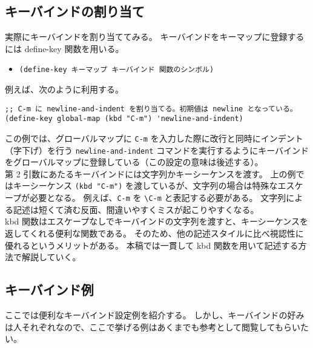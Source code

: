 \subsection{キーバインドの割り当て}
実際にキーバインドを割り当ててみる。
キーバインドをキーマップに登録するには define-key 関数を用いる。
\begin{itemize}\setlength{\leftskip}{-1.00zw}%
\item[] \texttt{(define-key キーマップ キーバインド 関数のシンボル)}
\end{itemize}
例えば、次のように利用する。
\begin{mdframed}[roundcorner=0.50zw,leftmargin=3.00zw,rightmargin=3.00zw,skipabove=0.40zw,skipbelow=0.40zw,innertopmargin=4.00pt,innerbottommargin=4.00pt,innerleftmargin=5.00pt,innerrightmargin=5.00pt,linecolor=gray!020,linewidth=0.50pt,backgroundcolor=gray!20]
\begin{verbatim}
;; C-m に newline-and-indent を割り当てる。初期値は newline となっている。
(define-key global-map (kbd "C-m") 'newline-and-indent)
\end{verbatim}
\end{mdframed}
この例では、グローバルマップに \texttt{C-m} を入力した際に改行と同時にインデント（字下げ）を行う \texttt{newline-and-indent} コマンドを実行するようにキーバインドをグローバルマップに登録している（この設定の意味は後述する）。\\

第 2 引数にあたるキーバインドには文字列かキーシーケンスを渡す。
上の例ではキーシーケンス \verb|(kbd "C-m")| を渡しているが、文字列の場合は特殊なエスケープが必要となる。
例えば、\texttt{C-m} を \texttt{\textbackslash{}C-m} と表記する必要がある。
文字列による記述は短くて済む反面、間違いやすくミスが起こりやすくなる。\\

kbd 関数はエスケープなしでキーバインドの文字列を渡すと、キーシーケンスを返してくれる便利な関数である。
そのため、他の記述スタイルに比べ視認性に優れるというメリットがある。
本稿では一貫して kbd 関数を用いて記述する方法で解説していく。
\subsection{キーバインド例}
ここでは便利なキーバインド設定例を紹介する。
しかし、キーバインドの好みは人それぞれなので、ここで挙げる例はあくまでも参考として閲覧してもらいたい。
